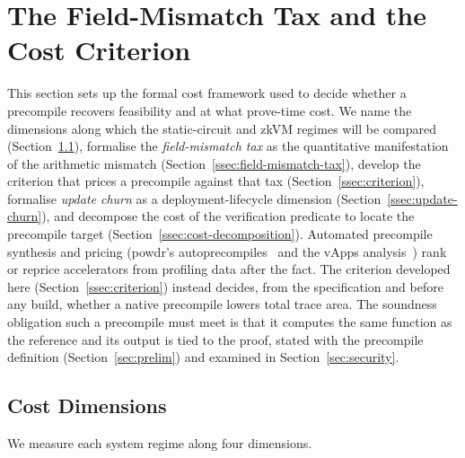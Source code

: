 \section{The Field-Mismatch Tax and the Cost Criterion}
\label{sec:theoretical}
This section sets up the formal cost framework used to decide whether a precompile recovers feasibility and at what prove-time cost. We name the dimensions along which the static-circuit and zkVM regimes will be compared (Section~\ref{ssec:cost-dimensions}), formalise the \emph{field-mismatch tax} as the quantitative manifestation of the arithmetic mismatch (Section~\ref{ssec:field-mismatch-tax}), develop the criterion that prices a precompile against that tax (Section~\ref{ssec:criterion}), formalise \emph{update churn} as a deployment-lifecycle dimension (Section~\ref{ssec:update-churn}), and decompose the cost of the verification predicate to locate the precompile target (Section~\ref{ssec:cost-decomposition}). Automated precompile synthesis and pricing (powdr's autoprecompiles~\cite{powdr2025autoprecompiles} and the vApps analysis~\cite{vapps2025}) rank or reprice accelerators from profiling data after the fact. The criterion developed here (Section~\ref{ssec:criterion}) instead decides, from the specification and before any build, whether a native precompile lowers total trace area. The soundness obligation such a precompile must meet is that it computes the same function as the reference and its output is tied to the proof, stated with the precompile definition (Section~\ref{sec:prelim}) and examined in Section~\ref{sec:security}.

\subsection{Cost Dimensions}\label{ssec:cost-dimensions}
We measure each system regime along four dimensions.

